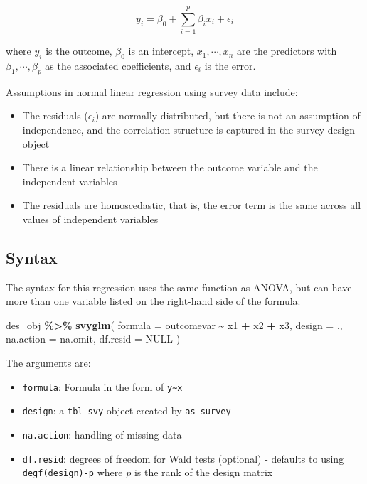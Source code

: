 \documentclass[
]{krantz}
\makeatletter
\newenvironment{Shaded}{\begin{snugshade}}{\end{snugshade}}
\newcommand{\AttributeTok}[1]{\textcolor[rgb]{0.27,0.27,0.27}{#1}}
\newcommand{\ConstantTok}[1]{\textcolor[rgb]{0.37,0.37,0.37}{#1}}
\newcommand{\FunctionTok}[1]{\textcolor[rgb]{0.27,0.27,0.27}{\textbf{#1}}}
\newcommand{\NormalTok}[1]{#1}
\newcommand{\SpecialCharTok}[1]{\textcolor[rgb]{0.43,0.43,0.43}{\textbf{#1}}}
\providecommand{\tightlist}{%
  \setlength{\itemsep}{0pt}\setlength{\parskip}{0pt}}
\newenvironment{kframe}{%
\medskip{}
\setlength{\fboxsep}{.8em}
 \def\at@end@of@kframe{}%
 \ifinner\ifhmode%
  \def\at@end@of@kframe{\end{minipage}}%
  \begin{minipage}{\columnwidth}%
 \fi\fi%
 \def\FrameCommand##1{\hskip\@totalleftmargin \hskip-\fboxsep
 \colorbox{shadecolor}{##1}\hskip-\fboxsep
     \hskip-\linewidth \hskip-\@totalleftmargin \hskip\columnwidth}%
 \MakeFramed {\advance\hsize-\width
   \@totalleftmargin\z@ \linewidth\hsize
   \@setminipage}}%
 {\par\unskip\endMakeFramed%
 \at@end@of@kframe}
\renewenvironment{Shaded}{\begin{kframe}}{\end{kframe}}
\makeatother
\begin{document}
\begin{equation}
y_i=\beta_0 +\sum_{i=1}^p \beta_i x_i + \epsilon_i
\label{eq:normallin}
\end{equation}

where \(y_i\) is the outcome, \(\beta_0\) is an intercept, \(x_1, \cdots, x_n\) are the predictors with \(\beta_1, \cdots, \beta_p\) as the associated coefficients, and \(\epsilon_i\) is the error.

Assumptions in normal linear regression using survey data include:

\begin{itemize}
\tightlist
\item
  The residuals (\(\epsilon_i\)) are normally distributed, but there is not an assumption of independence, and the correlation structure is captured in the survey design object
\item
  There is a linear relationship between the outcome variable and the independent variables
\item
  The residuals are homoscedastic, that is, the error term is the same across all values of independent variables
\end{itemize}

\hypertarget{syntax-7}{%
\subsection{Syntax}\label{syntax-7}}

The syntax for this regression uses the same function as ANOVA, but can have more than one variable listed on the right-hand side of the formula:

\begin{Shaded}
\begin{Highlighting}[]
\NormalTok{des\_obj }\SpecialCharTok{\%\textgreater{}\%}
  \FunctionTok{svyglm}\NormalTok{(}
    \AttributeTok{formula =}\NormalTok{ outcomevar }\SpecialCharTok{\textasciitilde{}}\NormalTok{ x1 }\SpecialCharTok{+}\NormalTok{ x2 }\SpecialCharTok{+}\NormalTok{ x3,}
    \AttributeTok{design =}\NormalTok{ .,}
    \AttributeTok{na.action =}\NormalTok{ na.omit,}
    \AttributeTok{df.resid =} \ConstantTok{NULL}
\NormalTok{  )}
\end{Highlighting}
\end{Shaded}

The arguments are:

\begin{itemize}
\tightlist
\item
  \texttt{formula}: Formula in the form of \texttt{y\textasciitilde{}x}
\item
  \texttt{design}: a \texttt{tbl\_svy} object created by \texttt{as\_survey}
\item
  \texttt{na.action}: handling of missing data
\item
  \texttt{df.resid}: degrees of freedom for Wald tests (optional) - defaults to using \texttt{degf(design)-p} where \(p\) is the rank of the design matrix
\end{itemize}
\end{document}

